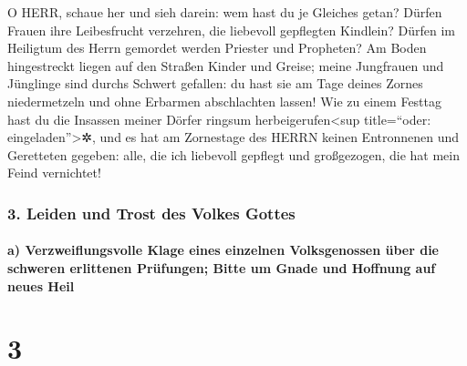 O HERR, schaue her und sieh darein: wem hast du je
Gleiches getan? Dürfen Frauen ihre Leibesfrucht verzehren, die liebevoll
gepflegten Kindlein? Dürfen im Heiligtum des Herrn gemordet werden
Priester und Propheten? Am Boden hingestreckt liegen auf
den Straßen Kinder und Greise; meine Jungfrauen und Jünglinge sind
durchs Schwert gefallen: du hast sie am Tage deines Zornes niedermetzeln
und ohne Erbarmen abschlachten lassen! Wie zu einem
Festtag hast du die Insassen meiner Dörfer ringsum
herbeigerufen\textless sup title=``oder: eingeladen''\textgreater✲, und
es hat am Zornestage des HERRN keinen Entronnenen und Geretteten
gegeben: alle, die ich liebevoll gepflegt und großgezogen, die hat mein
Feind vernichtet!

\hypertarget{leiden-und-trost-des-volkes-gottes}{%
\subsubsection{3. Leiden und Trost des Volkes
Gottes}\label{leiden-und-trost-des-volkes-gottes}}

\hypertarget{a-verzweiflungsvolle-klage-eines-einzelnen-volksgenossen-uxfcber-die-schweren-erlittenen-pruxfcfungen-bitte-um-gnade-und-hoffnung-auf-neues-heil}{%
\paragraph{a) Verzweiflungsvolle Klage eines einzelnen Volksgenossen
über die schweren erlittenen Prüfungen; Bitte um Gnade und Hoffnung auf
neues
Heil}\label{a-verzweiflungsvolle-klage-eines-einzelnen-volksgenossen-uxfcber-die-schweren-erlittenen-pruxfcfungen-bitte-um-gnade-und-hoffnung-auf-neues-heil}}

\hypertarget{section-2}{%
\section{3}\label{section-2}}

